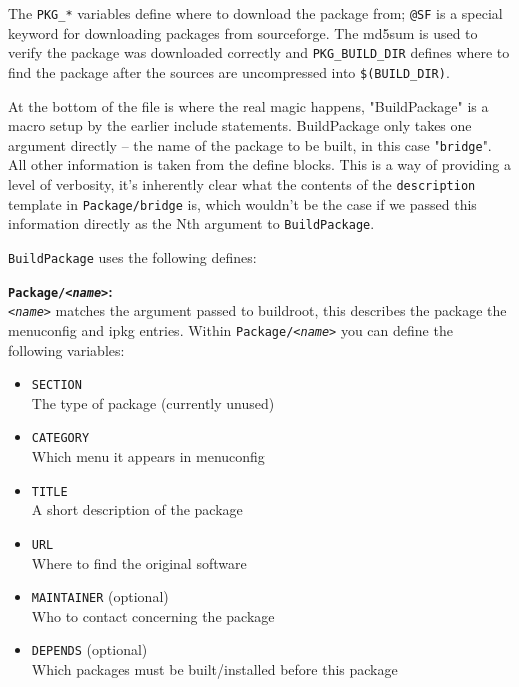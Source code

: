 The \texttt{PKG\_*} variables define where to download the package from;
\texttt{@SF} is a special keyword for downloading packages from sourceforge.
The md5sum is used to verify the package was downloaded correctly and
\texttt{PKG\_BUILD\_DIR} defines where to find the package after the sources are
uncompressed into \texttt{\$(BUILD\_DIR)}.

At the bottom of the file is where the real magic happens, "BuildPackage" is a macro
setup by the earlier include statements. BuildPackage only takes one argument directly --
the name of the package to be built, in this case "\texttt{bridge}". All other information
is taken from the define blocks. This is a way of providing a level of verbosity, it's
inherently clear what the contents of the \texttt{description} template in
\texttt{Package/bridge} is, which wouldn't be the case if we passed this information
directly as the Nth argument to \texttt{BuildPackage}.

\texttt{BuildPackage} uses the following defines:

\textbf{\texttt{Package/\textit{<name>}}:} \\
    \texttt{\textit{<name>}} matches the argument passed to buildroot, this describes
    the package the menuconfig and ipkg entries. Within \texttt{Package/\textit{<name>}}
    you can define the following variables:

    \begin{itemize}
        \item \texttt{SECTION} \\
            The type of package (currently unused)
        \item \texttt{CATEGORY} \\
            Which menu it appears in menuconfig
        \item \texttt{TITLE} \\
            A short description of the package
        \item \texttt{URL} \\
            Where to find the original software
        \item \texttt{MAINTAINER} (optional) \\
            Who to contact concerning the package
        \item \texttt{DEPENDS} (optional) \\
            Which packages must be built/installed before this package
    \end{itemize}

